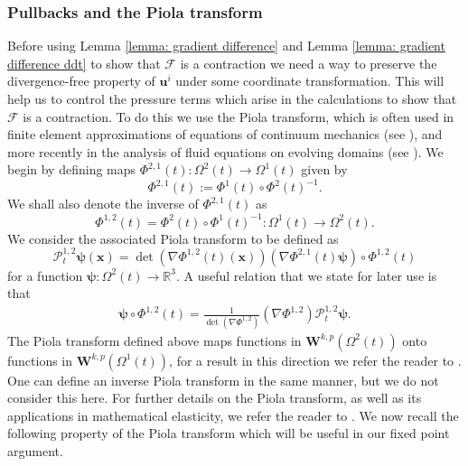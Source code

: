 \documentclass[a4paper]{amsart}
\numberwithin{equation}{section}
\newcommand{\grad}{\nabla}
\theoremstyle{plain}
\newcommand{\mbf}[1]{\mathbf{#1}}
\newcommand{\mbb}[1]{\mathbb{#1}}
\begin{document}
\subsubsection{Pullbacks and the Piola transform}
Before using Lemma \ref{lemma: gradient difference} and Lemma \ref{lemma: gradient difference ddt} to show that $\mathscr{F}$ is a contraction we need a way to preserve the divergence-free property of $\mbf{u}^i$ under some coordinate transformation.
This will help us to control the pressure terms which arise in the calculations to show that $\mathscr{F}$ is a contraction.
To do this we use the Piola transform, which is often used in finite element approximations of equations of continuum mechanics (see \cite{aznaran2022transformations,ern2021finite,rognes2010efficient}), and more recently in the analysis of fluid equations on evolving domains (see \cite{djurdjevac2023evolving,elliott2024navier,olshanskii2022tangential}).
We begin by defining maps $\Phi^{2,1}(t) : \Omega^2(t) \rightarrow \Omega^1(t)$ given by
\[ \Phi^{2,1}(t) := \Phi^1(t) \circ \Phi^2(t)^{-1} .\]
We shall also denote the inverse of $\Phi^{2,1}(t)$ as
\[ \Phi^{1,2}(t) = \Phi^2(t) \circ \Phi^1(t)^{-1} : \Omega^1(t) \rightarrow \Omega^2(t). \]
We consider the associated Piola transform to be defined as
\[\mathcal{P}_t^{1,2} \boldsymbol{\psi}(\mbf{x}) = {\det(\grad\Phi^{1,2}(t)(\mbf{x}))} (\grad\Phi^{2,1}(t) \boldsymbol{\psi} )\circ \Phi^{1,2}(t) \]
for a function $\boldsymbol{\psi}: \Omega^2(t) \rightarrow \mbb{R}^3$.
A useful relation that we state for later use is that
\begin{align}
    \boldsymbol{\psi} \circ \Phi^{1,2}(t) = \frac{1}{\det(\grad\Phi^{1,2})} (\grad\Phi^{1,2}) \mathcal{P}_t^{1,2}\boldsymbol{\psi}. \label{eqn: piola pullback relation}
\end{align}
The Piola transform defined above maps functions in $\mbf{W}^{k,p}(\Omega^2(t))$ onto functions in $\mbf{W}^{k,p}(\Omega^1(t))$, for a result in this direction we refer the reader to \cite[Appendix A]{djurdjevac2023evolving}.
One can define an inverse Piola transform in the same manner, but we do not consider this here.
For further details on the Piola transform, as well as its applications in mathematical elasticity,  we refer the reader to \cite{ciarlet2021mathematical}.
We now recall the following property of the Piola transform which will be useful in our fixed point argument.
\end{document}
